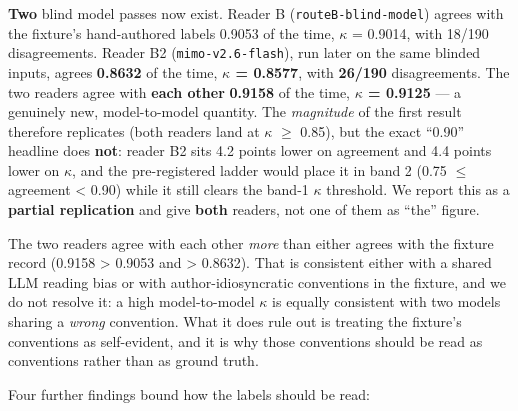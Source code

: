 \documentclass[11pt,a4paper]{article}
\begin{document}
\textbf{Two} blind model passes now exist. Reader B (\texttt{routeB-blind-model}) agrees with the fixture's hand-authored labels 0.9053 of the time, $\kappa$ = 0.9014, with 18/190 disagreements. Reader B2 (\texttt{mimo-v2.6-flash}), run later on the same blinded inputs, agrees \textbf{0.8632} of the time, \textbf{$\kappa$ = 0.8577}, with \textbf{26/190} disagreements. The two readers agree with \textbf{each other} \textbf{0.9158} of the time, \textbf{$\kappa$ = 0.9125} --- a genuinely new, model-to-model quantity. The \emph{magnitude} of the first result therefore replicates (both readers land at $\kappa$ $\ge$ 0.85), but the exact ``0.90'' headline does \textbf{not}: reader B2 sits 4.2 points lower on agreement and 4.4 points lower on $\kappa$, and the pre-registered ladder would place it in band 2 (0.75 $\le$ agreement < 0.90) while it still clears the band-1 $\kappa$ threshold. We report this as a \textbf{partial replication} and give \textbf{both} readers, not one of them as ``the'' figure.

The two readers agree with each other \emph{more} than either agrees with the fixture record (0.9158 > 0.9053 and > 0.8632). That is consistent either with a shared LLM reading bias or with author-idiosyncratic conventions in the fixture, and we do not resolve it: a high model-to-model $\kappa$ is equally consistent with two models sharing a \emph{wrong} convention. What it does rule out is treating the fixture's conventions as self-evident, and it is why those conventions should be read as conventions rather than as ground truth.

Four further findings bound how the labels should be read:
\end{document}
